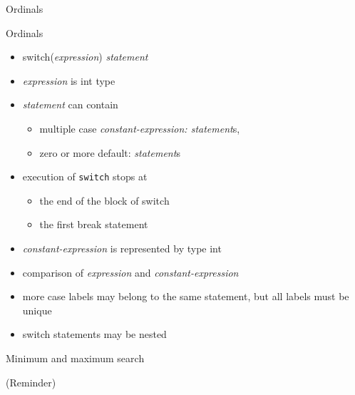 \documentclass[usenames,dvipsnames,aspectratio=169]{beamer}
\newcommand{\kiemel}[1]{{\color{kiemelesszin}#1}}
\begin{document}
\begin{frame}{Ordinals}
    \begin{exampleblock}{}
    \scriptsize
    \vspace{-.3cm}
    
    \vspace{-.3cm}
  \end{exampleblock}
\end{frame}

\begin{frame}{Ordinals}
  \begin{itemize}
    \item \kiemel{switch}(\emph{expression}) \emph{statement}
    \item \emph{expression} is int type
    \item \emph{statement} can contain
    \begin{itemize}
      \item multiple \kiemel{case} \emph{constant-expression: statement}s,
      \item zero or more \kiemel{default:} \emph{statement}s
    \end{itemize}
    \item execution of \texttt{switch} stops at
    \begin{itemize}
      \item the end of the block of \kiemel{switch}
      \item the first \kiemel{break} statement
    \end{itemize}
    \item \emph{constant-expression} is represented by type int
    \item comparison of \emph{expression} and \emph{constant-expression}
    \item more \kiemel{case} labels may belong to the same statement, but all labels must be unique
    \item \kiemel{switch} statements may be nested
  \end{itemize}
\end{frame}

\begin{frame}{Minimum and maximum search}
    \begin{exampleblock}{ (Reminder)}
    \tiny
    
  \end{exampleblock}
\end{frame}
\end{document}
